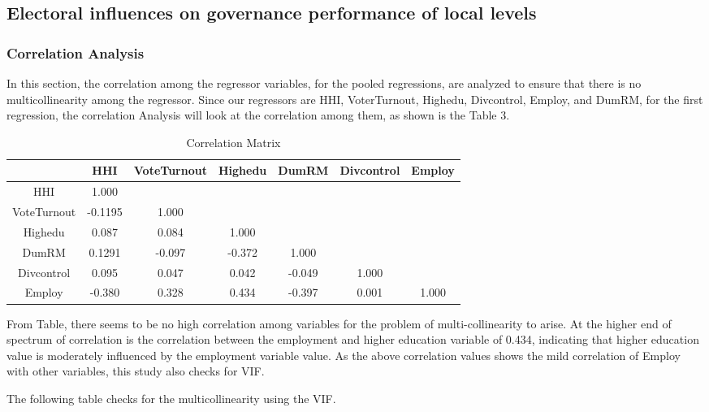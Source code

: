 \subsection{Electoral influences on governance performance of local levels}
\subsubsection{Correlation Analysis}
In this section, the correlation among the regressor variables, for the pooled regressions, are analyzed to ensure that there is no multicollinearity among the regressor. Since our regressors are HHI, VoterTurnout, Highedu, Divcontrol, Employ, and DumRM, for the first regression, the correlation Analysis will look at the correlation among them, as shown is the Table 3.\\
\begin{table}[ht]
\centering
\begin{tabular}{ccccccc}

    & HHI & VoteTurnout & Highedu & DumRM & Divcontrol & Employ\\ 
    \hline
HHI & 1.000 &  &  &  & &  \\ 
VoteTurnout & -0.1195 & 1.000 & &  & &  \\ 
Highedu & 0.087 & 0.084 & 1.000& & & \\ 
DumRM & 0.1291 & -0.097 & -0.372 & 1.000 & & \\ 
Divcontrol & 0.095 & 0.047 & 0.042 & -0.049 & 1.000 & \\ 
Employ & -0.380 & 0.328 & 0.434 & -0.397 & 0.001 & 1.000 \\
\hline
\end{tabular}
\caption{Correlation Matrix}
\label{Correlation Matrix}
\end{table}
From Table, there seems to be no high correlation among variables for the problem of multi-collinearity to arise. At the higher end of spectrum of correlation is the correlation between the employment  and higher education variable of 0.434, indicating that higher education value is moderately influenced by the employment variable value. As the above correlation values shows the mild correlation of Employ with other variables, this study also checks for VIF.   \par
The following table checks for the multicollinearity using the VIF. 

